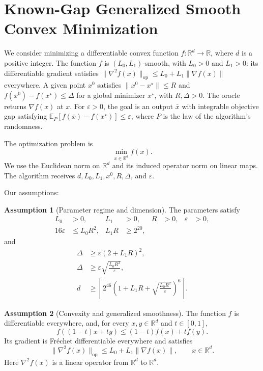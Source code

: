 \documentclass[10pt]{article}
\theoremstyle{definition}
\newtheorem{assumption}{Assumption}
\begin{document}
\section*{Known-Gap Generalized Smooth Convex Minimization}
We consider minimizing a differentiable convex function $f:\mathbb{R}^d\to\mathbb{R}$, where $d$ is a positive integer. The function $f$ is $(L_0,L_1)$-smooth, with $L_0>0$ and $L_1>0$: its differentiable gradient satisfies $\|\nabla^2 f(x)\|_{\mathrm{op}}\leq L_0+L_1\|\nabla f(x)\|$ everywhere. A given point $x^0$ satisfies $\|x^0-x^\star\|\leq R$ and $f(x^0)-f(x^\star)\leq\Delta$ for a global minimizer $x^\star$, with $R,\Delta>0$. The oracle returns $\nabla f(x)$ at $x$. For $\varepsilon>0$, the goal is an output $\bar{x}$ with integrable objective gap satisfying $\mathbb{E}_{P}[f(\bar{x})-f(x^\star)]\leq\varepsilon$, where $P$ is the law of the algorithm's randomness.

The optimization problem is
\[
\min_{x\in\mathbb{R}^d} f(x).
\]
We use the Euclidean norm on $\mathbb{R}^d$ and its induced operator norm on linear maps. The algorithm receives $d,L_0,L_1,x^0,R,\Delta$, and $\varepsilon$.

Our assumptions:
\begin{assumption}[Parameter regime and dimension]
The parameters satisfy
\[
\begin{aligned}
L_0&>0, & L_1&>0, & R&>0, & \varepsilon&>0,\\
16\varepsilon&\leq L_0R^2,
& L_1R&\geq 2^{20},
\end{aligned}
\]
and
\[
\begin{aligned}
\Delta&\geq\varepsilon(2+L_1R)^2,\\
\Delta&\geq\varepsilon\sqrt{\frac{L_0R^2}{\varepsilon}},\\
d&\geq\left\lceil
2^{46}\left(1+L_1R+\sqrt{\frac{L_0R^2}{\varepsilon}}\right)^6
\right\rceil.
\end{aligned}
\]
\end{assumption}

\begin{assumption}[Convexity and generalized smoothness]
The function $f$ is differentiable everywhere, and, for every $x,y\in\mathbb{R}^d$ and $t\in[0,1]$,
\[
f((1-t)x+ty)\leq(1-t)f(x)+tf(y).
\]
Its gradient is Fr\'echet differentiable everywhere and satisfies
\[
\|\nabla^2 f(x)\|_{\mathrm{op}}
\leq L_0+L_1\|\nabla f(x)\|,
\qquad x\in\mathbb{R}^d.
\]
Here $\nabla^2 f(x)$ is a linear operator from $\mathbb{R}^d$ to $\mathbb{R}^d$.
\end{assumption}
\end{document}
